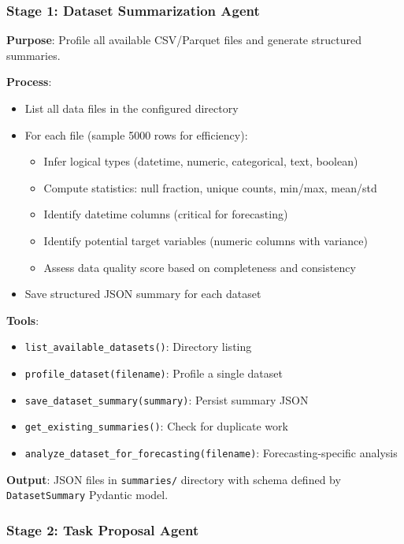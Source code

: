 \documentclass[11pt,a4paper]{article}
\begin{document}
\subsubsection{Stage 1: Dataset Summarization Agent}

\textbf{Purpose}: Profile all available CSV/Parquet files and generate structured summaries.

\textbf{Process}:
\begin{itemize}
    \item List all data files in the configured directory
    \item For each file (sample 5000 rows for efficiency):
    \begin{itemize}
        \item Infer logical types (datetime, numeric, categorical, text, boolean)
        \item Compute statistics: null fraction, unique counts, min/max, mean/std
        \item Identify datetime columns (critical for forecasting)
        \item Identify potential target variables (numeric columns with variance)
        \item Assess data quality score based on completeness and consistency
    \end{itemize}
    \item Save structured JSON summary for each dataset
\end{itemize}

\textbf{Tools}:
\begin{itemize}
    \item \texttt{list\_available\_datasets()}: Directory listing
    \item \texttt{profile\_dataset(filename)}: Profile a single dataset
    \item \texttt{save\_dataset\_summary(summary)}: Persist summary JSON
    \item \texttt{get\_existing\_summaries()}: Check for duplicate work
    \item \texttt{analyze\_dataset\_for\_forecasting(filename)}: Forecasting-specific analysis
\end{itemize}

\textbf{Output}: JSON files in \texttt{summaries/} directory with schema defined by \texttt{DatasetSummary} Pydantic model.

\subsubsection{Stage 2: Task Proposal Agent}
\end{document}
